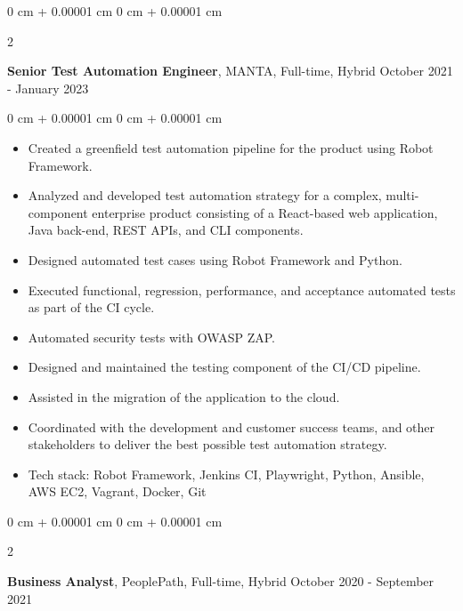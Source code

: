 \documentclass[10pt, letterpaper]{article}
\newenvironment{highlights}{
    \begin{itemize}[
        topsep=0.10 cm,
        parsep=0.10 cm,
        partopsep=0pt,
        itemsep=0pt,
        leftmargin=0 cm + 10pt
    ]
}{
    \end{itemize}
} %
\newenvironment{onecolentry}{
    \begin{adjustwidth}{
        0 cm + 0.00001 cm
    }{
        0 cm + 0.00001 cm
    }
}{
    \end{adjustwidth}
} %
\newenvironment{twocolentry}[2][]{
    \onecolentry
    \def\secondColumn{#2}
    \setcolumnwidth{\fill, 4.5 cm}
    \begin{paracol}{2}
}{
    \switchcolumn \raggedleft \secondColumn
    \end{paracol}
    \endonecolentry
} %
\begin{document}
        \vspace{0.2 cm}

        \begin{twocolentry}{
            October 2021 - January 2023
        }
            \textbf{Senior Test Automation Engineer}, MANTA, Full-time, Hybrid\end{twocolentry}

        \vspace{0.10 cm}
        \begin{onecolentry}
            \begin{highlights}
                \item Created a greenfield test automation pipeline for the product using Robot Framework.
                \item Analyzed and developed test automation strategy for a complex, multi-component enterprise product consisting of a React-based web application, Java back-end, REST APIs, and CLI components.
                \item Designed automated test cases using Robot Framework and Python.
                \item Executed functional, regression, performance, and acceptance automated tests as part of the CI cycle.
                \item Automated security tests with OWASP ZAP.
                \item Designed and maintained the testing component of the CI/CD pipeline.
                \item Assisted in the migration of the application to the cloud.
                \item Coordinated with the development and customer success teams, and other stakeholders to deliver the best possible test automation strategy.
                \item Tech stack: Robot Framework, Jenkins CI, Playwright, Python, Ansible, AWS EC2, Vagrant, Docker, Git
            \end{highlights}
        \end{onecolentry}

        \vspace{0.2 cm}

        \begin{twocolentry}{
            October 2020 - September 2021
        }
            \textbf{Business Analyst}, PeoplePath, Full-time, Hybrid\end{twocolentry}
\end{document}
